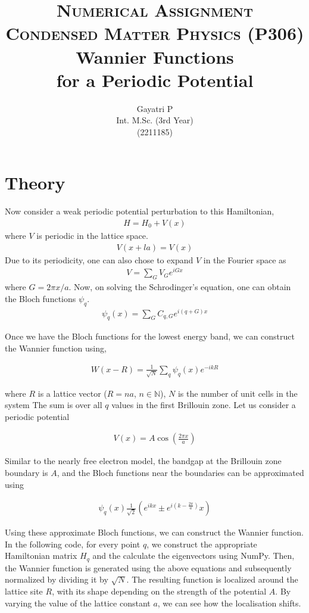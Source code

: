 \documentclass[12pt,a4paper]{article}
\title{\textsc{\large Numerical Assignment\\Condensed Matter Physics (P306)} \\ {\bf\LARGE \vspace{.5em} Wannier Functions\\for a Periodic Potential}}
\author{Gayatri P\\Int. M.Sc. (3rd Year)\\ (2211185)}
\begin{document}
\maketitle

\section{Theory}

Now consider a weak periodic potential perturbation to this Hamiltonian,
\begin{align*}
    H = H_0 + V(x)
\end{align*}
where $V$ is periodic in the lattice space.
\begin{align*}
    V(x+la) = V(x)
\end{align*}
Due to its periodicity, one can also chose to expand $V$ in the Fourier space as
\begin{align*}
    V= \sum_{G} V_G e^{iGx}
\end{align*}
where $G=2\pi x/a$. Now, on solving the Schrodinger's equation, one can obtain the Bloch functions $\psi_q$.
\begin{align*}
    \psi_q(x) = \sum_G C_{q,G} e^{i(q + G)x}
\end{align*}

Once we have the Bloch functions for the lowest energy band, we can construct the Wannier function using,

\begin{align*}
    W(x - R) = \frac{1}{\sqrt{N}} \sum_q \psi_q(x) e^{-ikR}
\end{align*}

where $R$ is a lattice vector ($R = na$, $n \in \mathbb{N}$), $N$ is the number of unit cells in the system
The sum is over all $q$ values in the first Brillouin zone. Let us consider a periodic potential

\begin{align*}
    V(x) = A\cos \left(\frac{2\pi x}{a}\right)
\end{align*}

Similar to the nearly free electron model, the bandgap at the Brillouin zone boundary is $A$, and the Bloch functions near the boundaries can be approximated using

\begin{align*}
    \psi_q(x) \frac{1}{\sqrt{2}} \left(e^{ikx} \pm e^{i\left(k-\frac{2\pi}{a}\right)}x\right) 
\end{align*}

Using these approximate Bloch functions, we can construct the Wannier function. In the following code, for every point $q$, we construct the appropriate Hamiltonian matrix $H_q$ and the calculate the eigenvectors using NumPy. Then, the Wannier function is generated using the above equations and subsequently normalized by dividing it by $\sqrt{N}$. The resulting function is localized around the lattice site $R$, with its shape depending on the strength of the potential $A$. By varying the value of the lattice constant $a$, we can see how the localisation shifts.
\end{document}
